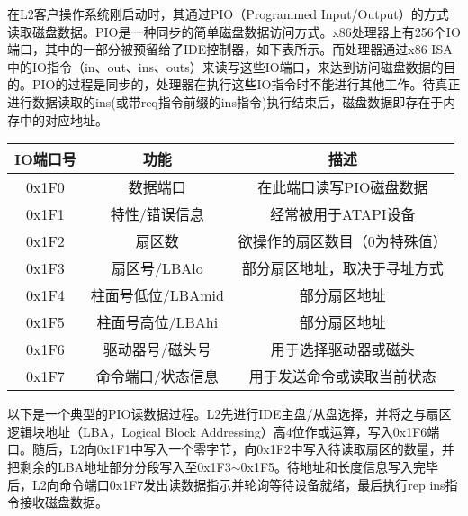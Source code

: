 在L2客户操作系统刚启动时，其通过PIO（Programmed Input/Output）的方式读取磁盘数据。PIO是一种同步的简单磁盘数据访问方式。x86处理器上有256个IO端口，其中的一部分被预留给了IDE控制器，如下表所示。而处理器通过x86 ISA中的IO指令（in、out、ins、outs）来读写这些IO端口，来达到访问磁盘数据的目的。PIO的过程是同步的，处理器在执行这些IO指令时不能进行其他工作。待真正进行数据读取的ins(或带req指令前缀的ins指令)执行结束后，磁盘数据即存在于内存中的对应地址。

\begin{table}[htpb]
\centering
\begin{tabular}{ccc}
\toprule
IO端口号	& 功能 & 描述\\
\midrule
0x1F0	& 数据端口	& 在此端口读写PIO磁盘数据\\
0x1F1	& 特性/错误信息	& 经常被用于ATAPI设备\\
0x1F2	& 扇区数	& 欲操作的扇区数目（0为特殊值）\\
0x1F3	& 扇区号/LBAlo	& 部分扇区地址，取决于寻址方式\\
0x1F4	& 柱面号低位/LBAmid	& 部分扇区地址\\
0x1F5	& 柱面号高位/LBAhi	& 部分扇区地址\\
0x1F6	& 驱动器号/磁头号	& 用于选择驱动器或磁头\\
0x1F7	& 命令端口/状态信息	& 用于发送命令或读取当前状态\\
\bottomrule
\end{tabular}
\end{table}

以下是一个典型的PIO读数据过程。L2先进行IDE主盘/从盘选择，并将之与扇区逻辑块地址（LBA，Logical Block Addressing）高4位作或运算，写入0x1F6端口。随后，L2向0x1F1中写入一个零字节，向0x1F2中写入待读取扇区的数量，并把剩余的LBA地址部分分段写入至0x1F3$\sim$0x1F5。待地址和长度信息写入完毕后，L2向命令端口0x1F7发出读数据指示并轮询等待设备就绪，最后执行rep ins指令接收磁盘数据。

